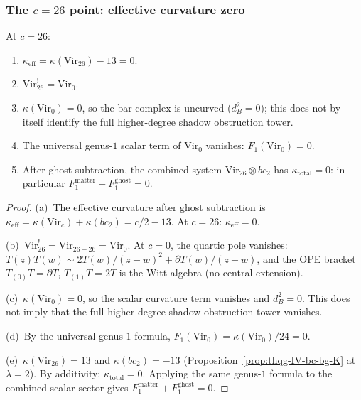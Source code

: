 \subsubsection{The \texorpdfstring{$c = 26$}{c = 26} point:
effective curvature zero}

\begin{theorem}[The $c = 26$ degeneration; \ClaimStatusProvedHere]
\label{thm:thqg-IV-c26}
At $c = 26$:
\begin{enumerate}[label=\textup{(\alph*)}]
\item $\kappa_{\mathrm{eff}} = \kappa(\mathrm{Vir}_{26}) - 13 = 0$.
\item $\mathrm{Vir}_{26}^! = \mathrm{Vir}_0$.
\item $\kappa(\mathrm{Vir}_0) = 0$, so the bar complex is uncurved
 ($d_B^2 = 0$); this does not by itself identify the full
 higher-degree shadow obstruction tower.
\item The universal genus-$1$ scalar term of $\mathrm{Vir}_0$
 vanishes: $F_1(\mathrm{Vir}_0) = 0$.
\item After ghost subtraction, the combined system
 $\mathrm{Vir}_{26} \otimes bc_2$ has $\kappa_{\mathrm{total}} = 0$:
 in particular
 $F_1^{\mathrm{matter}} + F_1^{\mathrm{ghost}} = 0$.
\end{enumerate}
\end{theorem}

\begin{proof}
(a)~The effective curvature after ghost subtraction is
$\kappa_{\mathrm{eff}} = \kappa(\mathrm{Vir}_c) + \kappa(bc_2)
= c/2 - 13$. At $c = 26$: $\kappa_{\mathrm{eff}} = 0$.

(b)~$\mathrm{Vir}_{26}^! = \mathrm{Vir}_{26-26} = \mathrm{Vir}_0$.
At $c = 0$, the quartic pole vanishes: $T(z)T(w) \sim 2T(w)/(z-w)^2
+ \partial T(w)/(z-w)$, and the OPE bracket $T_{(0)}T = \partial T$,
$T_{(1)}T = 2T$ is the Witt algebra (no central extension).

(c)~$\kappa(\mathrm{Vir}_0) = 0$, so the scalar curvature term
vanishes and $d_B^2 = 0$. This does not imply that the full
higher-degree shadow obstruction tower vanishes.

(d)~By the universal genus-$1$ formula,
$F_1(\mathrm{Vir}_0) = \kappa(\mathrm{Vir}_0)/24 = 0$.

(e)~$\kappa(\mathrm{Vir}_{26}) = 13$ and $\kappa(bc_2) = -13$
(Proposition~\ref{prop:thqg-IV-bc-bg-K} at $\lambda = 2$).
By additivity: $\kappa_{\mathrm{total}} = 0$. Applying the same
genus-$1$ formula to the combined scalar sector gives
$F_1^{\mathrm{matter}} + F_1^{\mathrm{ghost}} = 0$.
\end{proof}


